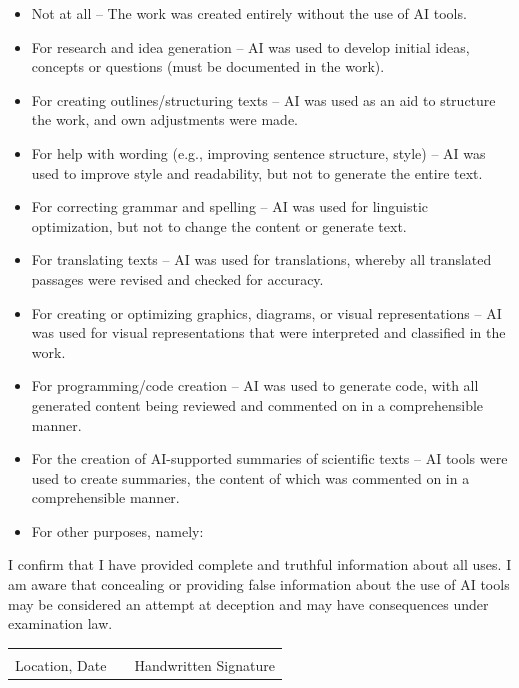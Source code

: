 \begin{itemize}
    \item[\Square] Not at all – The work was created entirely without the use of AI tools.
    \item[\Square] For research and idea generation – AI was used to develop initial ideas, concepts or questions (must be documented in the work).
    \item[\XBox] For creating outlines/structuring texts – AI was used as an aid to structure the work, and own adjustments were made.
    \item[\Square] For help with wording (e.g., improving sentence structure, style) – AI was used to improve style and readability, but not to generate the entire text.
    \item[\XBox] For correcting grammar and spelling – AI was used for linguistic optimization, but not to change the content or generate text.
    \item[\Square] For translating texts – AI was used for translations, whereby all translated passages were revised and checked for accuracy.
    \item[\XBox] For creating or optimizing graphics, diagrams, or visual representations – AI was used for visual representations that were interpreted and classified in the work.
    \item[\XBox] For programming/code creation – AI was used to generate code, with all generated content being reviewed and commented on in a comprehensible manner.
    \item[\Square] For the creation of AI-supported summaries of scientific texts – AI tools were used to create summaries, the content of which was commented on in a comprehensible manner.
    \item[\Square] For other purposes, namely: \hrulefill
\end{itemize}

I confirm that I have provided complete and truthful information about all uses. I am aware that concealing or providing false information about the use of AI tools may be considered an attempt at deception and may have consequences under examination law.

\vspace{1.5cm}

\noindent
\begin{tabular}{@{}p{6cm} p{2cm} p{7cm}@{}} 
    \hrulefill & & \hrulefill \\ 
    Location, Date & & Handwritten Signature
\end{tabular}

\cleardoublepage
